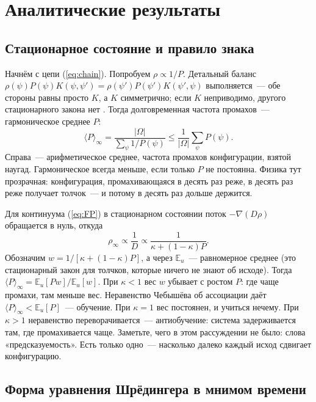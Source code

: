 \documentclass[pre,twocolumn,superscriptaddress,showpacs=false,amsmath,amssymb,nofootinbib]{revtex4-2}
\begin{document}
\section{Аналитические результаты}\label{sec:results}

\subsection{Стационарное состояние и правило знака}

Начнём с цепи (\ref{eq:chain}). Попробуем $\rho\propto1/P$. Детальный баланс $\rho(\psi)P(\psi)K(\psi,\psi')=\rho(\psi')P(\psi')K(\psi',\psi)$ выполняется~--- обе стороны равны просто $K$, а $K$ симметрично; если $K$ неприводимо, другого стационарного закона нет \cite{Norris1997}. Тогда долговременная частота промахов~--- гармоническое среднее $P$:
\begin{equation}
\langle P\rangle_\infty=\frac{|\Omega|}{\sum_\psi1/P(\psi)}\le\frac1{|\Omega|}\sum_\psi P(\psi).
\label{eq:harmonic}
\end{equation}
Справа~--- арифметическое среднее, частота промахов конфигурации, взятой наугад. Гармоническое всегда меньше, если только $P$ не постоянна. Физика тут прозрачная: конфигурация, промахивающаяся в десять раз реже, в десять раз реже получает толчок~--- и потому в десять раз дольше держится.

Для континуума (\ref{eq:FP}) в стационарном состоянии поток $-\nabla(D\rho)$ обращается в нуль, откуда
\begin{equation}
\rho_\infty\propto\frac1D\propto\frac1{\kappa+(1-\kappa)P}.
\label{eq:rho}
\end{equation}
Обозначим $w=1/[\kappa+(1-\kappa)P]$, а через $\mathbb E_u$~--- равномерное среднее (это стационарный закон для толчков, которые ничего не знают об исходе). Тогда $\langle P\rangle_\infty=\mathbb E_u[Pw]/\mathbb E_u[w]$. При $\kappa<1$ вес $w$ убывает с ростом $P$: где чаще промахи, там меньше вес. Неравенство Чебышёва об ассоциации \cite{Chebyshev1882} даёт $\langle P\rangle_\infty<\mathbb E_u[P]$~--- обучение. При $\kappa=1$ вес постоянен, и учиться нечему. При $\kappa>1$ неравенство переворачивается~--- антиобучение: система задерживается там, где промахивается чаще. Заметьте, чего в этом рассуждении не было: слова «предсказуемость». Есть только одно~--- насколько далеко каждый исход сдвигает конфигурацию.

\subsection{Форма уравнения Шрёдингера в мнимом времени}
\end{document}
